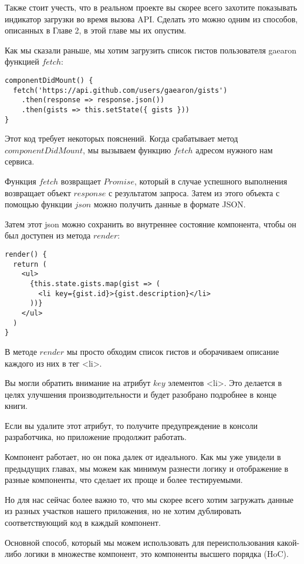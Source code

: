 Также стоит учесть, что в реальном проекте вы скорее всего захотите показывать индикатор загрузки во время вызова API. Сделать это можно одним из способов, описанных в Главе 2, в этой главе мы их опустим.

Как мы сказали раньше, мы хотим загрузить список гистов пользователя gaearon функцией $fetch$:

\begin{lstlisting}
componentDidMount() {
  fetch('https://api.github.com/users/gaearon/gists')
    .then(response => response.json())
    .then(gists => this.setState({ gists }))
}
\end{lstlisting}

Этот код требует некоторых пояснений. Когда срабатывает метод $componentDidMount$, мы вызываем функцию $fetch$ адресом нужного нам сервиса.

Функция $fetch$ возвращает $Promise$, который в случае успешного выполнения возвращает объект $response$ с результатом запроса. Затем из этого объекта с помощью функции $json$ можно получить данные в формате JSON.

Затем этот json можно сохранить во внутреннее состояние компонента, чтобы он был доступен из метода $render$:

\begin{lstlisting}
render() {
  return (
    <ul>
      {this.state.gists.map(gist => (
        <li key={gist.id}>{gist.description}</li>
      ))}
    </ul> 
  )
}
\end{lstlisting}

В методе $render$ мы просто обходим список гистов и оборачиваем описание каждого из них в тег <li>.

Вы могли обратить внимание на атрибут $key$ элементов <li>. Это делается в целях улучшения производительности и будет разобрано подробнее в конце книги.

Если вы удалите этот атрибут, то получите предупреждение в консоли разработчика, но приложение продолжит работать.

Компонент работает, но он пока далек от идеального. Как мы уже увидели в предыдущих главах, мы можем как минимум разнести логику и отображение в разные компоненты, что сделает их проще и более тестируемыми.

Но для нас сейчас более важно то, что мы скорее всего хотим загружать данные из разных участков нашего приложения, но не хотим дублировать соответствующий код в каждый компонент.

Основной способ, который мы можем использовать для переиспользования какой-либо логики в множестве компонент, это компоненты высшего порядка (HoC).

